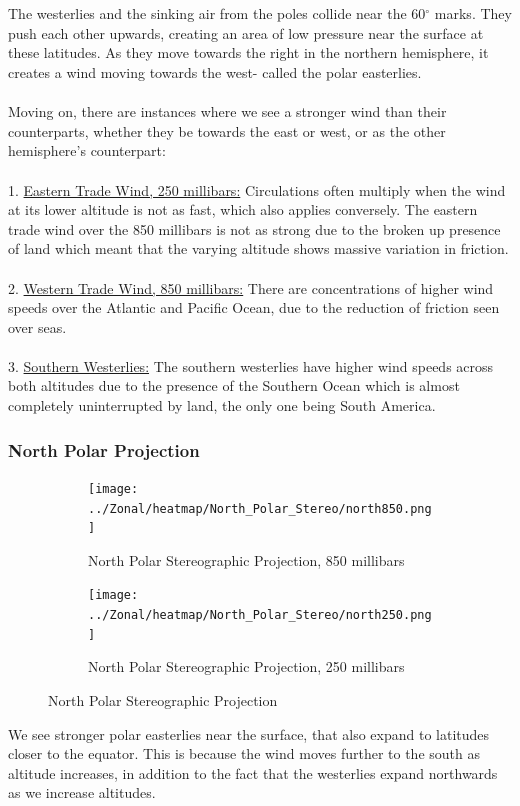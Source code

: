 \documentclass[hidelinks]{article}
\begin{document}
\\\\
The westerlies and the sinking air from the poles collide near the 60$^\circ$ marks. They push each other upwards, creating an area of low pressure near the surface at these latitudes. As they move towards the right in the northern hemisphere, it creates a wind moving towards the west- called the polar easterlies.
\\\\
Moving on, there are instances where we see a stronger wind than their counterparts, whether they be towards the east or west, or as the other hemisphere's counterpart:\\\\
1. \underline{Eastern Trade Wind, 250 millibars:} Circulations often multiply when the wind at its lower altitude is not as fast, which also applies conversely. The eastern trade wind over the 850 millibars is not as strong due to the broken up presence of land which meant that the varying altitude shows massive variation in friction. 
\\\\
2. \underline{Western Trade Wind, 850 millibars:} There are concentrations of higher wind speeds over the Atlantic and Pacific Ocean, due to the reduction of friction seen over seas. 
\\\\
3.  \underline{Southern Westerlies:} The southern westerlies have higher wind speeds across both altitudes due to the presence of the Southern Ocean which is almost completely uninterrupted by land, the only one being South America.
\newpage
\subsubsection{North Polar Projection}
\begin{figure}[h!]
	\begin{subfigure}[b]{\linewidth}
		\centering
		\texttt{[image: ../Zonal/heatmap/North\_Polar\_Stereo/north850.png]}
		\caption{North Polar Stereographic Projection, 850 millibars}
	\end{subfigure}
	\begin{subfigure}[b]{\linewidth}
		\centering
		\texttt{[image: ../Zonal/heatmap/North\_Polar\_Stereo/north250.png]}
		\caption{North Polar Stereographic Projection, 250 millibars}
	\end{subfigure}
	\caption{North Polar Stereographic Projection}
\end{figure}
\noindent We see stronger polar easterlies near the surface, that also expand to latitudes closer to the equator. This is because the wind moves further to the south as altitude increases, in addition to the fact that the westerlies expand northwards as we increase altitudes.
\newpage
\end{document}

